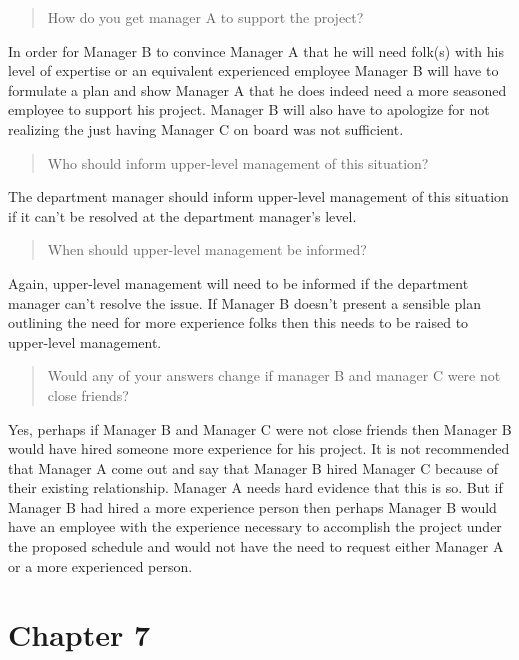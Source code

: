 \documentclass[letterpaper,10pt]{article}
\begin{document}
\begin{quotation}How do you get manager A to support the project?\end{quotation}

In order for Manager B to convince Manager A that he will need folk(s) with his level of expertise or an equivalent experienced employee Manager B will have to formulate a plan and show Manager A that he does indeed need a more seasoned employee to support his project.  Manager B will also have to apologize for not realizing the just having Manager C on board was not sufficient.

\begin{quotation}Who should inform upper-level management of this situation?\end{quotation}

The department manager should inform upper-level management of this situation if it can't be resolved at the department manager's level.

\begin{quotation}When should upper-level management be informed?\end{quotation}

Again, upper-level management will need to be informed if the department manager can't resolve the issue.  If Manager B doesn't present a sensible plan outlining the need for more experience folks then this needs to be raised to upper-level management.

\begin{quotation}Would any of your answers change if manager B and manager C were not close friends?\end{quotation}  

Yes, perhaps if Manager B and Manager C were not close friends then Manager B would have hired someone more experience for his project.  It is not recommended that Manager A come out and say that Manager B hired Manager C because of their existing relationship.  Manager A needs hard evidence that this is so.  But if Manager B had hired a more experience person then perhaps Manager B would have an employee with the experience necessary to accomplish the project under the proposed schedule and would not have the need to request either Manager A or a more experienced person.

\section*{Chapter 7}
\end{document}
